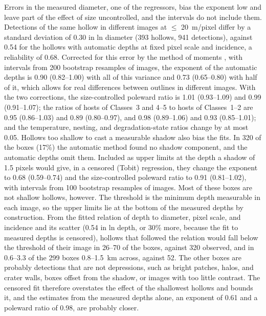\documentclass{planetary}
\begin{document}
Errors in the measured diameter, one of the regressors, bias the exponent low and leave part of the effect of size uncontrolled, and the intervals do not include them. Detections of the same hollow in different images at $\leq$ 20~m/pixel differ by a standard deviation of 0.30 in ln diameter (393 hollows, 941 detections), against 0.54 for the hollows with automatic depths at fixed pixel scale and incidence, a reliability of 0.68. Corrected for this error by the method of moments \parencite{fuller1987}, with intervals from 200 bootstrap resamples of images, the exponent of the automatic depths is 0.90 (0.82--1.00) with all of this variance and 0.73 (0.65--0.80) with half of it, which allows for real differences between outlines in different images. With the two corrections, the size-controlled poleward ratio is 1.01 (0.93--1.09) and 0.99 (0.91--1.07); the ratios of hosts of Classes~3 and 4--5 to hosts of Classes~1--2 are 0.95 (0.86--1.03) and 0.89 (0.80--0.97), and 0.98 (0.89--1.06) and 0.93 (0.85--1.01); and the temperature, nesting, and degradation-state ratios change by at most 0.05. Hollows too shallow to cast a measurable shadow also bias the fits. In 320 of the boxes (17\%) the automatic method found no shadow component, and the automatic depths omit them. Included as upper limits at the depth a shadow of 1.5 pixels would give, in a censored (Tobit) regression, they change the exponent to 0.68 (0.59--0.74) and the size-controlled poleward ratio to 0.91 (0.81--1.02), with intervals from 100 bootstrap resamples of images. Most of these boxes are not shallow hollows, however. The threshold is the minimum depth measurable in each image, so the upper limits lie at the bottom of the measured depths by construction. From the fitted relation of depth to diameter, pixel scale, and incidence and its scatter (0.54 in ln depth, or 30\% more, because the fit to measured depths is censored), hollows that followed the relation would fall below the threshold of their image in 26--70 of the boxes, against 320 observed, and in 0.6--3.3 of the 299 boxes 0.8--1.5~km across, against 52. The other boxes are probably detections that are not depressions, such as bright patches, halos, and crater walls, boxes offset from the shadow, or images with too little contrast. The censored fit therefore overstates the effect of the shallowest hollows and bounds it, and the estimates from the measured depths alone, an exponent of 0.61 and a poleward ratio of 0.98, are probably closer.
\end{document}
